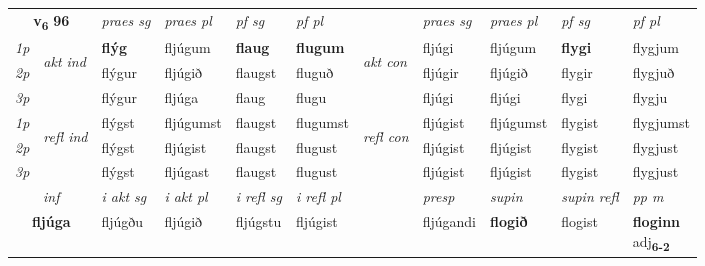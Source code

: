 \noindent
\begin{tabular}{lllllllllll} \toprule
\multicolumn{2}{c}{\textbf{v{\textsubscript{6}}} \Large{\textbf{96}}}  &  \textit{praes sg}  & \textit{praes pl}  &\textit{ pf sg} & \textit{pf pl} &  &  \textit{praes sg}  & \textit{praes pl}  & \textit{pf sg} & \textit{pf pl } \\*
	\cmidrule{3-6} \cmidrule{8-11}
 {\textit{1p}} & \multirow{3}{*}{\begin{turn}{90}\textit{akt ind}\end{turn}} & \textbf{flýg} & fljúgum & \textbf{flaug} & \textbf{flugum} & \multirow{3}{*}{\begin{turn}{90}\textit{akt con}\end{turn}} &fljúgi & fljúgum & \textbf{flygi} & flygjum\\*
 {\textit{2p}} &  &  flýgur  & fljúgið & flaugst & fluguð & & fljúgir & fljúgið & flygir & flygjuð \\*
{\textit{3p}} &  & flýgur & fljúga & flaug & flugu & & fljúgi & fljúgi& flygi & flygju \\*
\cmidrule{3-6} \cmidrule{8-11}
 {\textit{1p}} & \multirow{3}{*}{\begin{turn}{90}\textit{refl ind}\end{turn}}  & flýgst & fljúgumst & flaugst & flugumst & \multirow{3}{*}{\begin{turn}{90}\textit{refl con}\end{turn}}  &fljúgist & fljúgumst & flygist & flygjumst \\*
 {\textit{2p}} &  & flýgst & fljúgist & flaugst & flugust & &fljúgist & fljúgist & flygist & flygjust \\*
 {\textit{3p}}  & & flýgst & fljúgast & flaugst & flugust & & fljúgist & fljúgist& flygist & flygjust \\*
\cmidrule{3-6} \cmidrule{8-11}

   \multicolumn{2}{c}{\textit{inf}}  & \textit{i akt sg} & \textit{i akt pl} & \textit{i refl sg} & \textit{i refl pl} && \textit{presp} & \textit{supin} & \textit{supin refl} & \textit{pp m} \\*
  \multicolumn{2}{c}{\textbf{fljúga}} & fljúgðu  & fljúgið & fljúgstu & fljúgist && fljúgandi &  \textbf{flogið} & flogist & \specialcell{\textbf{floginn} \\ adj\textbf{\textsubscript{6-2}}} \\*
\end{tabular}

